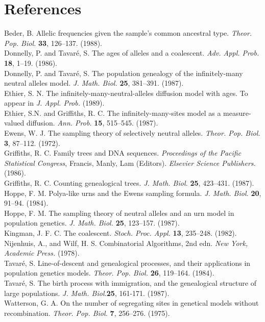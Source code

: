 \section{References}
{\sc Beder, B.} Allelic frequencies given the sample's common ancestral type.
{\em Theor. Pop. Biol.} {\bf 33}, 126--137. (1988).\\
{\sc Donnelly, P. and Tavar\'{e}, S.} The ages of alleles and a coalescent.
{\em Adv. Appl. Prob.} {\bf 18}, 1--19. (1986). \\
{\sc Donnelly, P. and Tavar\'{e}, S.} The population genealogy of the
infinitely-many neutral alleles model. {\em J. Math. Biol.} {\bf 25},
381--391. (1987). \\
{\sc Ethier, S. N.} The infinitely-many-neutral-alleles 
diffusion model with ages.
To appear in {\em J. Appl. Prob.} (1989).\\
{\sc Ethier, S.N. and Griffiths, R. C.} The infinitely-many-sites model 
as a measure-valued diffusion. {\em Ann. Prob.} {\bf 15}, 515--545. (1987). \\
{\sc Ewens, W. J.} The sampling theory of selectively neutral alleles.
{\em Theor. Pop. Biol.} {\bf 3}, 87--112. (1972). \\
{\sc Griffiths, R. C.} Family trees and DNA sequences.
{\em Proceedings of the Pacific Statistical Congress}, Francis, Manly,
Lam (Editors). {\em Elsevier Science Publishers.} (1986). \\
{\sc Griffiths, R. C.} Counting genealogical trees. {\em J. Math. Biol.}
{\bf 25}, 423--431. (1987).\\
{\sc Hoppe, F. M.} Polya-like urns and the Ewens sampling formula.
{\em J. Math. Biol.} {\bf 20}, 91--94. (1984). \\
{\sc Hoppe, F. M.} The sampling theory of neutral alleles and an urn model in
population genetics. {\em J. Math. Biol.} {\bf 25}, 123--157. (1987).\\
{\sc Kingman, J. F. C.} The coalescent. {\em Stoch. Proc. Appl.} {\bf 13},
235--248. (1982). \\
{\sc Nijenhuis, A., and Wilf, H. S.} Combinatorial Algorithms, 2nd edn.
{\em New York, Academic Press.} (1978).\\
{\sc Tavar\'{e}, S.} Line-of-descent and genealogical processes, and their
applications in population genetics models. {\em Theor. Pop. Biol.}
{\bf 26}, 119--164. (1984). \\
{\sc Tavar\'{e}, S.} The birth process with immigration, and the genealogical
structure of large populations. {\em J. Math. Biol.}{\bf 25}, 161-171.
 (1987). \\
{\sc Watterson, G. A.} On the number of segregating sites in genetical models
without recombination. {\em Theor. Pop. Biol.} {\bf 7}, 256--276. (1975).\\



